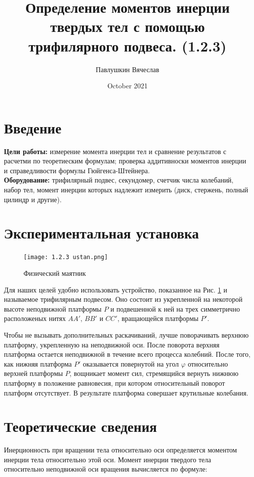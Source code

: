 \documentclass[a4paper,12pt]{article}
\title{\textbf{Определение моментов инерции твердых тел с помощью трифилярного подвеса. (1.2.3)}}
\author{Павлушкин Вячеслав}
\date{October 2021}
\begin{document}
	
	\maketitle
	
	\section{Введение}
	
	\textbf{Цели работы:} измерение момента инерции тел и сравнение результатов с расчетми по теоретиеским формулам; проверка аддитивноски моментов инерции и справедливости формулы Гюйгенса-Штейнера.\\
	\textbf{Оборудование:} трифилярный подвес, секундомер, счетчик числа колебаний, набор тел, момент инерции которых надлежит измерить (диск, стержень, полный цилиндр и другие).
	
	\section {Экспериментальная установка}
	
	\begin{figure}
		\texttt{[image: 1.2.3 ustan.png]}
		\caption{Физический маятник}\label{risunok}
	\end{figure}
	
	Для наших целей удобно использовать устройство, показанное на Рис. \ref{risunok} и называемое трифилярным подвесом. Оно состоит из укрепленной на некоторой высоте неподвижной платформы $P$ и подвешенной к ней на трех симметрично расположеных нитях $AA'$, $BB'$ и $CC'$, вращающейся платформы $P'$. 
	
	Чтобы не вызывать дополнительных раскачиваний, лучше поворачивать верхнюю платформу, укрепленную на неподвижной оси. После поворота верхняя платформа остается неподвижной в течение всего процесса колебний. После того, как нижняя платформа $P'$ оказывается повернутой на угол $\varphi$ относительно верхней платформы $P$, вощникает момент сил, стремящийся вернуть нижнюю платформу в положение равновесия, при котором относительный поворот платформ отсутствует. В результате платформа совершает крутильные колебания.
	
	\section{Теоретические сведения}
	
	\par Инерционность при вращении тела относительно оси определяется моментом инерции тела относительно этой оси. Момент инерции твердого тела относительно неподвижной оси вращения вычисляется по формуле:
	
\end{document}
